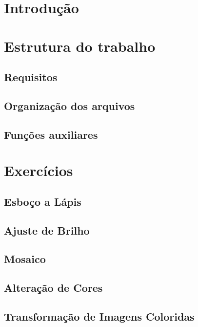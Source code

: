 \documentclass[12pt]{article}
\begin{document}
\tableofcontents %
\newpage

\section{Introdução}
    

\section{Estrutura do trabalho}
    \subsection{Requisitos}
    
    \subsection{Organização dos arquivos}
    
    \subsection{Funções auxiliares}
    

\section{Exercícios}
    \subsection{Esboço a Lápis}
    
    \subsection{Ajuste de Brilho}
    
    \subsection{Mosaico}
    
    \subsection{Alteração de Cores}
    
    \subsection{Transformação de Imagens Coloridas}
    
\end{document}
